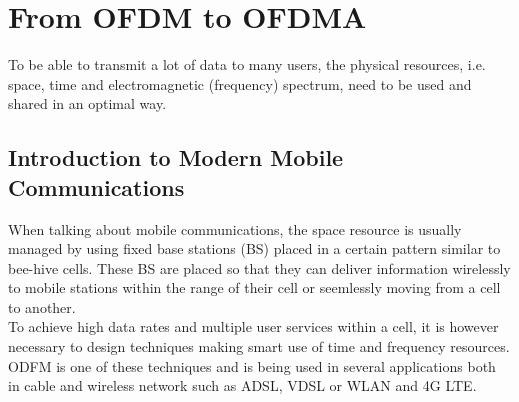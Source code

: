 \chapter{From OFDM to OFDMA}
\indent To be able to transmit a lot of data to many users, the physical resources, i.e. space, time and electromagnetic (frequency) spectrum, need to be used and shared in an optimal way.\\
%
\section{Introduction to Modern Mobile Communications}
\indent When talking about mobile communications, the space  resource is usually managed by using fixed base stations (BS) placed in a certain pattern similar to bee-hive cells. These BS are placed so that they can deliver information wirelessly to mobile stations within the range of their cell or seemlessly moving from a cell to another.\\
%
\indent To achieve high data rates and multiple user services within a cell, it is however necessary to design techniques making smart use of time and frequency resources. ODFM is one of these techniques and is being used in several applications both in cable and wireless network such as ADSL, VDSL or WLAN and 4G LTE.